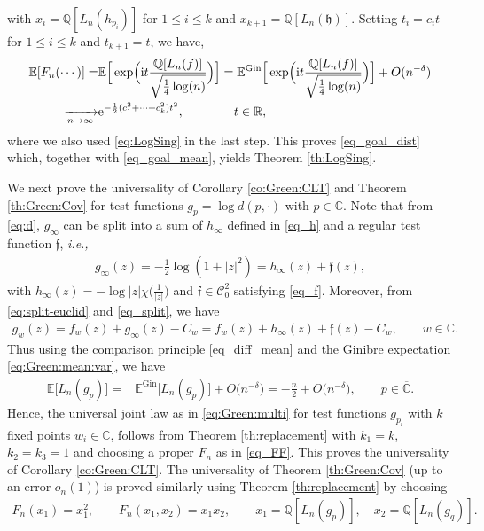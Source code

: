 \documentclass[10pt,reqno]{amsart}
\numberwithin{equation}{section}
\numberwithin{figure}{section}
\theoremstyle{plain}
\newcommand{\R}{{\mathbb{R}}}
\newcommand{\C}{{\mathbb{C}}}
\newcommand{\ii}{\mathrm{i}}
\newcommand{\<}{\langle}
\renewcommand{\>}{\rangle}
\newcommand{\E}{\mathbb{E}}
\newcommand{\ie}{\emph{i.e., }}
\begin{document}
with $x_i=\mathbb{Q} [L_n(h_{p_i})]$ for $1\leq i\leq k$ and $x_{k+1}=\mathbb{Q} [L_n(\mathfrak{h})]$. Setting $t_i=c_i t$ for $1\leq i\leq k$ and $t_{k+1}=t$, we have, 
\begin{align}
\E[F_n(\cdots)]=&\E \Big[ \exp \Bigl( \ii t \frac{\mathbb{Q}[L_n(f)]}{\sqrt{\frac{1}{4}\log(n)}}\Bigr)\Big]=\E^{\mathrm{Gin}} \Big[ \exp \Bigl( \ii t \frac{\mathbb{Q}[L_n(f)]}{\sqrt{\frac{1}{4}\log(n)}}\Bigr)\Big]+O(n^{-\delta})\nonumber\\
\xrightarrow[n\to\infty]{}&\mathrm{e}^{-\frac{1}{2}(c_1^2+\cdots+c_k^2) t^2}, \qquad \qquad t \in \R,
\end{align}
where we also used \eqref{eq:LogSing} in the last step. This proves \eqref{eq_goal_dist} which, together with \eqref{eq_goal_mean}, yields Theorem \ref{th:LogSing}.



%
%
%
%
%
%

We next prove the universality of Corollary \ref{co:Green:CLT} and Theorem \ref{th:Green:Cov} for test functions $g_p=\log d(p,\cdot)$ with $p\in \overline{\C}$. Note that from \eqref{eq:d}, $g_{\infty}$ can be split into a sum of $h_\infty$ defined in \eqref{eq_h} and a regular test function $\mathfrak{f}$, \ie 
	\begin{align}\label{eq_split}
		g_{\infty}(z)=-\frac{1}{2}\log (1+|z|^2)=h_\infty(z)+\mathfrak{f}(z),
	\end{align}
    with $h_{\infty}(z)=-\log |z| \chi\Big(\frac{1}{|z|}\Big)$ and $\mathfrak{f} \in \mathcal{C}_0^2$  satisfying \eqref{eq_f}. 
Moreover, from \eqref{eq:split-euclid} and \eqref{eq_split},  we  have  
	\begin{align}\label{eq_split1}
		g_{w}(z)=f_w(z)+g_{\infty}(z)-C_{w}=f_w(z)+h_\infty(z)+\mathfrak{f}(z)-C_{w}, \qquad w\in \C.
	\end{align}
    Thus using the comparison principle \eqref{eq_diff_mean} and the Ginibre expectation \eqref{eq:Green:mean:var}, we have
\begin{align}\label{eq_mean_2}   \E\big[L_n(g_{p})\big]=&\E^{\mathrm{Gin}}\big[L_n(g_{p})\big]+O\big( n^{-\delta}\big)=-\frac{n}{2}+O\big( n^{-\delta}\big), \qquad p \in \overline{\C}.
\end{align}
Hence, the universal joint law as in \eqref{eq:Green:multi} for test functions $g_{p_i}$ with $k$ fixed points $w_i \in \C$, follows from Theorem \ref{th:replacement} with $k_1=k$, $k_2=k_3=1$ and choosing a proper $F_n$ as in \eqref{eq_FF}. This proves the universality of Corollary \ref{co:Green:CLT}. The universality of Theorem \ref{th:Green:Cov} (up to an error $o_n(1)$) is proved similarly using Theorem \ref{th:replacement} by choosing
\begin{align}\label{eq_FFF}
F_n(x_1)=x_1^2, \qquad  F_n(x_1,x_2)=x_1x_2, \qquad x_1=\mathbb{Q}[L_n(g_p)], \quad x_2=\mathbb{Q}[L_n(g_q)].
\end{align}
\end{document}
